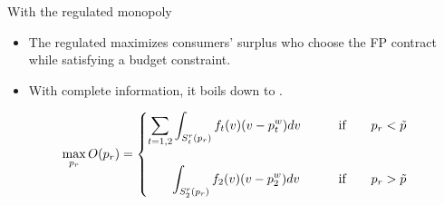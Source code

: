 \documentclass{class}
\begin{document}
\begin{frame}{With the regulated monopoly }\label{RamseyMonopoly}





\begin{itemize}
    \item The regulated maximizes consumers' surplus who choose the FP contract while satisfying a budget constraint. \vfill
    \item With complete information, it boils down to .  \vfill
\end{itemize}

\begin{equation*}
 \max_{p_r} O(p_r) = \begin{cases}
 \displaystyle \sum_{t=1,2} \int_{S^{r}_t(p_r)}f_t(v)(v-p_t^w)dv \quad \quad & \text{if} \quad \quad p_r < \Tilde{p} \\\\
 \displaystyle \;\;\;\;\;\;\; \int_{S^{r}_2(p_r)}f_2(v)(v-p_2^w)dv \quad \quad & \text{if} \quad \quad p_r > \Tilde{p}
 \end{cases}
\end{equation*}

\end{frame}

\end{document}
